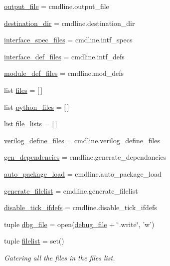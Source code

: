 \begin{DoxyCompactItemize}
\hyperlink{namespaceveripy_acf3a579572b494d5b9d6ec35c9df7688}{output\-\_\-file} = cmdline.\-output\-\_\-file
\item 
\hyperlink{namespaceveripy_a375e1799aa8688667cbbc85190d8f362}{destination\-\_\-dir} = cmdline.\-destination\-\_\-dir
\item 
\hyperlink{namespaceveripy_ab788939628a978e809745e050df2e8b6}{interface\-\_\-spec\-\_\-files} = cmdline.\-intf\-\_\-specs
\item 
\hyperlink{namespaceveripy_a60752cd883c2e6bcead5142e8c8b33c6}{interface\-\_\-def\-\_\-files} = cmdline.\-intf\-\_\-defs
\item 
\hyperlink{namespaceveripy_ab56a15afcf8acd3e32e33fbb4cea7765}{module\-\_\-def\-\_\-files} = cmdline.\-mod\-\_\-defs
\item 
list \hyperlink{namespaceveripy_ab7b6cf37a53cdc1b33b264beff792b41}{files} = \mbox{[}$\,$\mbox{]}
\item 
list \hyperlink{namespaceveripy_afcb1d5102cf817e349a771a7df45f78e}{python\-\_\-files} = \mbox{[}$\,$\mbox{]}
\item 
list \hyperlink{namespaceveripy_a960ab18337782696026b9181761b16db}{file\-\_\-lists} = \mbox{[}$\,$\mbox{]}
\item 
\hyperlink{namespaceveripy_aaa42df7d9bf399b8f41b39fd8e0d35ea}{verilog\-\_\-define\-\_\-files} = cmdline.\-verilog\-\_\-define\-\_\-files
\item 
\hyperlink{namespaceveripy_a18bec95d0fbc7d055d8eccf5f9d04060}{gen\-\_\-dependencies} = cmdline.\-generate\-\_\-dependancies
\item 
\hyperlink{namespaceveripy_a02329512579947b4e050bedace3bc009}{auto\-\_\-package\-\_\-load} = cmdline.\-auto\-\_\-package\-\_\-load
\item 
\hyperlink{namespaceveripy_a8b88691a75f930c9c74bc8e53e4a3ae7}{generate\-\_\-filelist} = cmdline.\-generate\-\_\-filelist
\item 
\hyperlink{namespaceveripy_acb8d40a5e53e8dfb03b5cc54272b1798}{disable\-\_\-tick\-\_\-ifdefs} = cmdline.\-disable\-\_\-tick\-\_\-ifdefs
\item 
tuple \hyperlink{namespaceveripy_aa41cbf123e5f09c0db694b12b8babbad}{dbg\-\_\-file} = open(\hyperlink{namespaceveripy_a0d00d319a78d1019f3fe9eecfe1add32}{debug\-\_\-file} + \char`\"{}.write\char`\"{}, 'w')
\item 
tuple \hyperlink{namespaceveripy_a1d45ff3e325dfaf68117ad7247341056}{filelist} = set()
\begin{DoxyCompactList}\small\item\em Gatering all the files in the files list. \end{DoxyCompactList}\item 

\end{DoxyCompactItemize}
